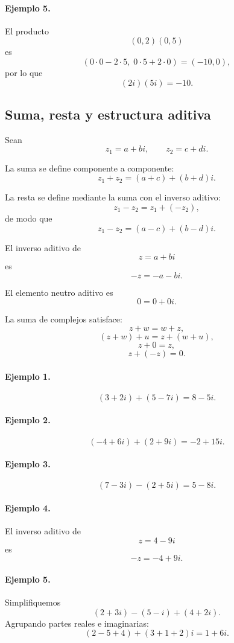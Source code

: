 \paragraph{Ejemplo 5.}
El producto
\[
(0,2)(0,5)
\]
es
\[
(0\cdot0-2\cdot5,\;0\cdot5+2\cdot0)
=
(-10,0),
\]
por lo que
\[
(2i)(5i)=-10.
\]

\subsection{Suma, resta y estructura aditiva}

Sean
\[
z_1=a+bi,
\qquad
z_2=c+di.
\]

La suma se define componente a componente:
\[
\boxed{
z_1+z_2
=
(a+c)+(b+d)i.
}
\]

La resta se define mediante la suma con el inverso aditivo:
\[
z_1-z_2
=
z_1+(-z_2),
\]
de modo que
\[
\boxed{
z_1-z_2
=
(a-c)+(b-d)i.
}
\]

El inverso aditivo de
\[
z=a+bi
\]
es
\[
\boxed{-z=-a-bi.}
\]

El elemento neutro aditivo es
\[
0=0+0i.
\]

La suma de complejos satisface:
\[
z+w=w+z,
\]
\[
(z+w)+u=z+(w+u),
\]
\[
z+0=z,
\]
\[
z+(-z)=0.
\]

\paragraph{Ejemplo 1.}
\[
(3+2i)+(5-7i)=8-5i.
\]

\paragraph{Ejemplo 2.}
\[
(-4+6i)+(2+9i)=-2+15i.
\]

\paragraph{Ejemplo 3.}
\[
(7-3i)-(2+5i)
=
5-8i.
\]

\paragraph{Ejemplo 4.}
El inverso aditivo de
\[
z=4-9i
\]
es
\[
-z=-4+9i.
\]

\paragraph{Ejemplo 5.}
Simplifiquemos
\[
(2+3i)-(5-i)+(4+2i).
\]
Agrupando partes reales e imaginarias:
\[
(2-5+4)+(3+1+2)i
=
\boxed{1+6i}.
\]

